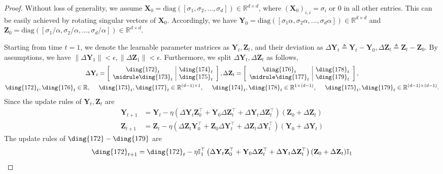 \documentclass{article}
\theoremstyle{plain}
\theoremstyle{remark}
\newcommand{\norm}[1]{\left\lVert#1\right\rVert}
\def\R{\mathbb{R}}
\def\bX{\mathbf{X}}
\def\bY{\mathbf{Y}}
\def\bZ{\mathbf{Z}}
\newcommand{\cc}[1]{\text{\ding{\number\numexpr#1 + 171\relax}}}
\begin{document}
\begin{proof}
    Without loss of generality, we assume $\bX_0=\text{diag}([\sigma_1,\sigma_2,\dots,\sigma_d])\in\R^{d\times d}$, where $(\bX_0)_{i,i}=\sigma_i$ or $0$ in all other entries. This can be easily achieved by rotating singular vectors of $\bX_0$. Accordingly, we have $\bY_0=\text{diag}([\sigma_1\alpha,\sigma_2\alpha,\dots,\sigma_d\alpha])\in\R^{d\times d}$ and $\bZ_0=\text{diag}([\sigma_1/\alpha,\sigma_2/\alpha,\dots,\sigma_d/\alpha])\in\R^{d\times d}$.

    Starting from time $t=1$, we denote the learnable parameter matrices as $\bY_t,\bZ_t$, and their deviation as $\Delta\bY_t\triangleq \bY_t-\bY_0, \Delta\bZ_t\triangleq \bZ_t-\bZ_0$. By assumptions, we have $\norm{\Delta\bY_1}<\epsilon, \norm{\Delta\bZ_1}<\epsilon$. Furthermore, we split $\Delta\bY_t, \Delta\bZ_t$ as follows,
    \begin{gather}
        \Delta\bY_t=
            \left[ \begin{array}{c|c}
               \cc{1}_t & \cc{3}_t \\
               \midrule
               \cc{2}_t & \cc{4}_t \\
            \end{array}
            \right],
        \Delta\bZ_t=
            \left[ \begin{array}{c|c}
               \cc{5}_t & \cc{7}_t \\
               \midrule
               \cc{6}_t & \cc{8}_t \\
            \end{array}
            \right],\\
        \cc{1}_t, \cc{5}_t\in\R,~~~~ \cc{2}_t, \cc{6}_t\in\R^{(d-1)\times 1},~~~~ \cc{3}_t, \cc{7}_t\in\R^{1\times (d-1)},~~~~ \cc{4}_t, \cc{8}_t\in\R^{(d-1) \times (d-1)}.
    \end{gather}
    Since the update rules of $\bY_t, \bZ_t$ are
    \begin{align}
        \bY_{t+1} &= \bY_{t} - \eta\left(\Delta \bY_t \bZ_0^\top + \bY_0 \Delta\bZ_t^\top + \Delta\bY_t\Delta\bZ_t^\top\right)\left(\bZ_0+\Delta\bZ_t\right) \\
        \bZ_{t+1} &= \bZ_t - \eta\left(\Delta\bZ_t\bY_0^\top + \bZ_0\Delta\bY_t^\top + \Delta\bZ_t\Delta\bY_t^\top\right)\left(\bY_0+\Delta\bY_t\right)
    \end{align}
    The update rules of $\cc{1}-\cc{8}$ are
    \begin{align}
        \cc{1}_{t+1} &= \cc{1}_t-\eta\mathbb{I}_1^\top\left(\Delta \bY_t \bZ_0^\top + \bY_0 \Delta\bZ_t^\top + \Delta\bY_t\Delta\bZ_t^\top\right)(\bZ_0+\Delta\bZ_t)\mathbb{I}_1 \\

\end{align}
\end{proof}
\end{document}
